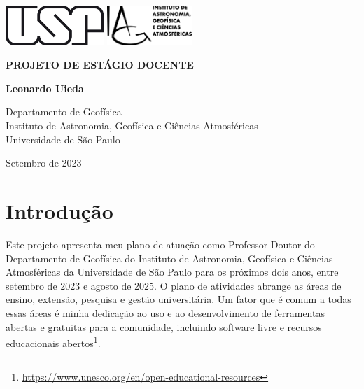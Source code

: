 \documentclass[12pt,a4paper,oneside]{book}
\newcommand{\Title}{Projeto de estágio docente}
\newcommand{\Year}{2023}
\newcommand{\Date}{Setembro de \Year{}}
\newcommand{\Author}{Leonardo Uieda}
\begin{document}
\pagestyle{empty}
\frontmatter

\begin{titlepage}
  \begin{center}
    \includegraphics[height=1.5cm]{figures/usp.png}
    \hfill
    \includegraphics[height=1.5cm]{figures/iag.png}
    \vspace{9cm}

    \textbf{\Huge \MakeUppercase{\Title{}}}
    \vspace{2cm}

    \textbf{\LARGE \Author{}}
    \vfill

    Departamento de Geofísica
    \\
    Instituto de Astronomia, Geofísica e Ciências Atmosféricas
    \\
    Universidade de São Paulo
    \vspace{2cm}

    \Date{}
  \end{center}
\end{titlepage}

\tableofcontents

\mainmatter
\pagestyle{fancy}

\chapter{Introdução}

Este projeto apresenta meu plano de atuação como Professor Doutor do
Departamento de Geofísica do Instituto de Astronomia, Geofísica e Ciências
Atmosféricas da Universidade de São Paulo para os próximos dois anos, entre
setembro de 2023 e agosto de 2025.
O plano de atividades abrange as áreas de ensino, extensão, pesquisa e gestão
universitária.
Um fator que é comum a todas essas áreas é minha dedicação ao uso e ao
desenvolvimento de ferramentas abertas e gratuitas para a comunidade, incluindo
software livre e recursos educacionais
abertos\footnote{\url{https://www.unesco.org/en/open-educational-resources}}.
\end{document}
